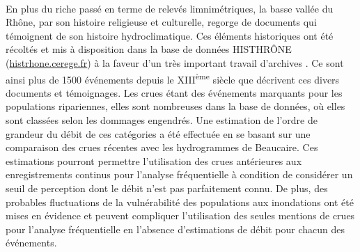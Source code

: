 \documentclass[11pt]{article}
\begin{document}
	\paragraph{} En plus du riche passé en terme de relevés limnimétriques, la basse vallée du Rhône, par son histoire religieuse et culturelle, regorge de documents qui témoignent de son histoire hydroclimatique. Ces éléments historiques ont été récoltés et mis à disposition dans la base de données HISTHRÔNE (\url{histrhone.cerege.fr}) à la faveur d'un très important travail d'archives \citep{pichard_sept_2014}. Ce sont ainsi plus de 1500 événements depuis le XIII\textsuperscript{ème} siècle que décrivent ces divers documents et témoignages. Les crues étant des événements marquants pour les populations ripariennes, elles sont nombreuses dans la base de données, où elles sont classées selon les dommages engendrés. Une estimation de l'ordre de grandeur du débit de ces catégories a été effectuée en se basant sur une comparaison des crues récentes avec les hydrogrammes de Beaucaire. Ces estimations pourront permettre l'utilisation des crues antérieures aux enregistrements continus pour l'analyse fréquentielle à condition de considérer un seuil de perception dont le débit n'est pas parfaitement connu. De plus, des probables fluctuations de la vulnérabilité des populations aux inondations ont été mises en évidence et peuvent compliquer l'utilisation des seules mentions de crues pour l'analyse fréquentielle en l'absence d'estimations de débit pour chacun des événements. 
\end{document}
